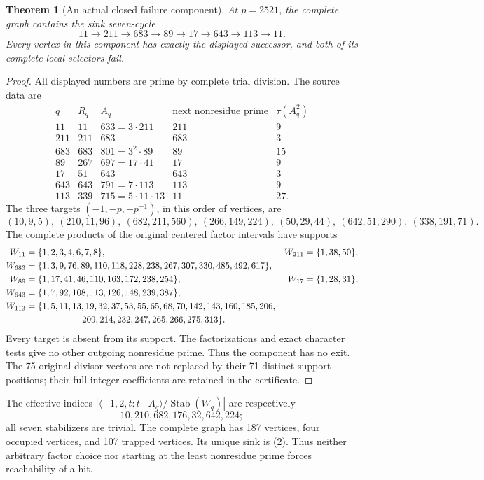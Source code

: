 \documentclass[10pt,a4paper]{article}
\newtheorem{theorem}{Theorem}
\begin{document}
\newpage
\begin{theorem}[An actual closed failure component]
At $p=2521$, the complete graph contains the sink seven-cycle
\[
 \boxed{11\to211\to683\to89\to17\to643\to113\to11.}
 \tag{2}
\]
Every vertex in this component has exactly the displayed successor, and both
of its complete local selectors fail.
\end{theorem}
\begin{proof}
All displayed numbers are prime by complete trial division. The source data are
\[
\begin{array}{r|r|l|r|r}
 q&R_q&A_q&\text{next nonresidue prime}&\tau(A_q^2)\\\hline
11&11&633=3\cdot211&211&9\\
211&211&683&683&3\\
683&683&801=3^2\cdot89&89&15\\
89&267&697=17\cdot41&17&9\\
17&51&643&643&3\\
643&643&791=7\cdot113&113&9\\
113&339&715=5\cdot11\cdot13&11&27.
\end{array}                                                \tag{3}
\]
The three targets $(-1,-p,-p^{-1})$, in this order of vertices, are
\[
 (10,9,5),\ (210,11,96),\ (682,211,560),\ (266,149,224),
 \ (50,29,44),\ (642,51,290),\ (338,191,71).
\]
The complete products of the original centered factor intervals have supports
\begin{align*}
W_{11}&=\{1,2,3,4,6,7,8\},&W_{211}&=\{1,38,50\},\\
W_{683}&=\{1,3,9,76,89,110,118,228,238,267,307,330,485,492,617\},\\
W_{89}&=\{1,17,41,46,110,163,172,238,254\},&W_{17}&=\{1,28,31\},\\
W_{643}&=\{1,7,92,108,113,126,148,239,387\},\\
W_{113}&=\{1,5,11,13,19,32,37,53,55,65,68,70,142,143,160,185,206,\\
&\hspace{22mm}209,214,232,247,265,266,275,313\}.
\end{align*}
Every target is absent from its support. The factorizations and exact character
tests give no other outgoing nonresidue prime. Thus the component has no exit.
The 75 original divisor vectors are not replaced by their 71 distinct support
positions; their full integer coefficients are retained in the certificate.
\end{proof}

The effective indices $|\langle-1,2,t:t\mid A_q\rangle/\operatorname{Stab}(W_q)|$
are respectively
\[
10,210,682,176,32,642,224;
\]
all seven stabilizers are trivial. The complete graph has 187 vertices, four
occupied vertices, and 107 trapped vertices. Its unique sink is (2).
Thus neither arbitrary factor choice nor starting at the least nonresidue
prime forces reachability of a hit.
\end{document}

